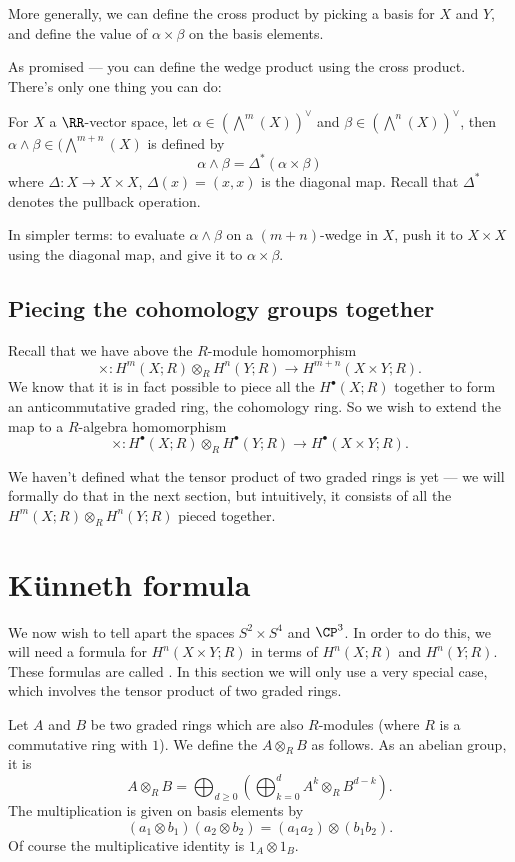 More generally, we can define the cross product by picking a basis for $X$ and $Y$, and define the
value of $\alpha \times \beta$ on the basis elements.

As promised --- you can define the wedge product using the cross product.
There's only one thing you can do:
\begin{definition}
	For $X$ a $\RR$-vector space,
	let $\alpha \in (\bigwedge^m(X))^\vee$ and $\beta \in (\bigwedge^n(X))^\vee$,
	then $\alpha \wedge \beta \in (\bigwedge^{m + n}(X)$ is defined by
	\[
		\alpha \wedge \beta = \Delta^*(\alpha \times \beta)
	\]
	where $\Delta \colon X \to X \times X$, $\Delta(x) = (x, x)$ is the diagonal map.
	Recall that $\Delta^*$ denotes the pullback operation.
\end{definition}
In simpler terms:
to evaluate $\alpha \wedge \beta$ on a $(m + n)$-wedge in $X$,
push it to $X \times X$ using the diagonal map, and give it to $\alpha \times \beta$.

\subsection{Piecing the cohomology groups together}

Recall that we have above the $R$-module homomorphism
\[ \times \colon H^m(X; R) \otimes_R H^n(Y; R) \to H^{m + n}(X \times Y; R). \]
We know that it is in fact possible to piece all the $H^\bullet(X; R)$ together to form
an anticommutative graded ring, the cohomology ring. So we wish to extend the map to a
$R$-algebra homomorphism
\[ \times \colon H^\bullet(X; R) \otimes_R H^\bullet(Y; R) \to H^\bullet(X \times Y; R). \]

We haven't defined what the tensor product of two graded rings is yet --- we will formally do that
in the next section, but intuitively, it consists of all the $H^m(X; R) \otimes_R H^n(Y; R)$
pieced together.

\section{K\"unneth formula}
We now wish to tell apart the spaces $S^2 \times S^4$ and $\CP^3$.
In order to do this, we will need a formula
for $H^n(X \times Y; R)$ in terms of $H^n(X;R)$ and $H^n(Y;R)$.
These formulas are called .
In this section we will only use a very special case,
which involves the tensor product of two graded rings.

\begin{definition}
	Let $A$ and $B$ be two graded rings which are also $R$-modules
	(where $R$ is a commutative ring with $1$).
	We define the  $A \otimes_R B$ as follows.
	As an abelian group, it is
	\[ A \otimes_R B = \bigoplus_{d \ge 0}
		\left( \bigoplus_{k=0}^{d} A^k \otimes_R B^{d-k}  \right). \]
	The multiplication is given on basis elements by
	\[ \left( a_1 \otimes b_1 \right)\left( a_2 \otimes b_2 \right)
		= (a_1a_2) \otimes (b_1b_2).
	\]
	Of course the multiplicative identity is $1_A \otimes 1_B$.
\end{definition}

